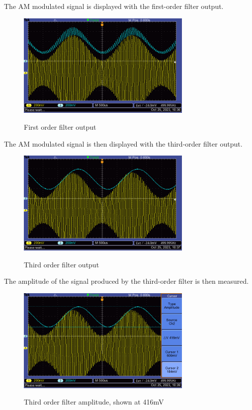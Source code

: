 The AM modulated signal is displayed with the first-order filter output.
\begin{figure}[H]
    \centering
    \includegraphics[width=0.75\textwidth]{images/execution_03_first_order.png}
    \label{fig:execution_03_first_order}
    \caption{First order filter output}
\end{figure}
The AM modulated signal is then displayed with the third-order filter output.
\begin{figure}[H]
    \centering
    \includegraphics[width=0.75\textwidth]{images/execution_03_third_order.png}
    \label{fig:execution_03_third_order}
    \caption{Third order filter output}
\end{figure}

The amplitude of the signal produced by the third-order filter is then measured.

\begin{figure}[H]
    \centering
    \includegraphics[width=0.75\textwidth]{images/execution_03_third_order_amp.png}
    \label{fig:execution_03_third_order_amp}
    \caption{Third order filter amplitude, shown at 416mV}
\end{figure}

